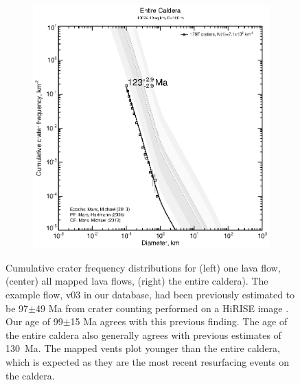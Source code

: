 \documentclass[12pt,letter]{article}
\begin{document}
\begin{figure}
\begin{subfigure}{.33\textwidth}
\end{subfigure}
\begin{subfigure}{.33\textwidth}
  \includegraphics[width=\linewidth,clip,trim=1cm 1cm 1.5cm 1cm]{figures/craterstats/arsia_fullarea_100m_cum.eps}
\end{subfigure}
\caption{Cumulative crater frequency distributions for (left) one lava flow, (center) all mapped lava flows, (right) the entire caldera). The example flow, v03 in our database, had been previously estimated to be 97$\pm$49 Ma from crater counting performed on a HiRISE image \citep{robbins2011volcanic}. Our age of 99$\pm$15 Ma agrees with this previous finding. The age of the entire caldera also generally agrees with previous estimates of 130~Ma. The mapped vents plot younger than the entire caldera, which is expected as they are the most recent resurfacing events on the caldera.}
\label{fig_craterct}
\end{figure}
\end{document}
